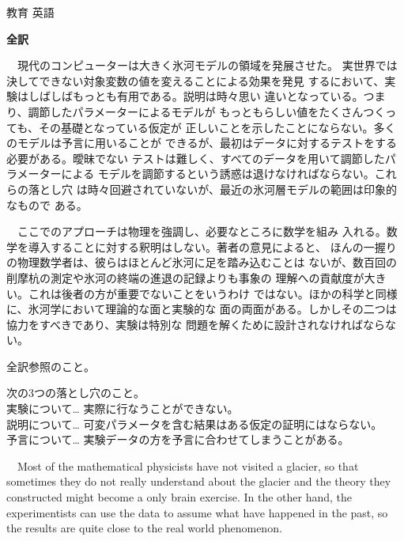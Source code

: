 \documentclass[fleqn]{jbook}
\begin{document}
\begin{answer}{教育 英語}{}
\begin{subanswers}
\SubAnswer
  {\bf 全訳}

  　現代のコンピューターは大きく氷河モデルの領域を発展させた。
  実世界では決してできない対象変数の値を変えることによる効果を発見
  するにおいて、実験はしばしばもっとも有用である。説明は時々思い
  違いとなっている。つまり、調節したパラメーターによるモデルが
  もっともらしい値をたくさんつくっても、その基礎となっている仮定が
  正しいことを示したことにならない。多くのモデルは予言に用いることが
  できるが、最初はデータに対するテストをする必要がある。曖昧でない
  テストは難しく、すべてのデータを用いて調節したパラメーターによる
  モデルを調節するという誘惑は退けなければならない。これらの落とし穴
  は時々回避されていないが、最近の氷河層モデルの範囲は印象的なもので
  ある。

  　ここでのアプローチは物理を強調し、必要なところに数学を組み
  入れる。数学を導入することに対する釈明はしない。著者の意見によると、
  ほんの一握りの物理数学者は、彼らはほとんど氷河に足を踏み込むことは
  ないが、数百回の削摩杭の測定や氷河の終端の進退の記録よりも事象の
  理解への貢献度が大きい。これは後者の方が重要でないことをいうわけ
  ではない。ほかの科学と同様に、氷河学において理論的な面と実験的な
  面の両面がある。しかしその二つは協力をすべきであり、実験は特別な
  問題を解くために設計されなければならない。

  \begin{subsubanswers}
  \SubSubAnswer
    全訳参照のこと。

  \SubSubAnswer
     次の3つの落とし穴のこと。\\
     実験について…%
       実際に行なうことができない。\\
     説明について…%
       可変パラメータを含む結果はある仮定の証明にはならない。\\
     予言について…%
       実験データの方を予言に合わせてしまうことがある。

  \SubSubAnswer
  \baselineskip=12pt
    　Most of the mathematical physicists have not visited a glacier,
    so that sometimes they do not really understand about the glacier
    and the theory they constructed might become a only brain exercise.
    In the other hand, the experimentists can use the data to assume
    what have happened in the past, so the results are quite close to
    the real world phenomenon.
  \baselineskip=15pt
  \end{subsubanswers}


\end{subanswers}
\end{answer}
\end{document}
